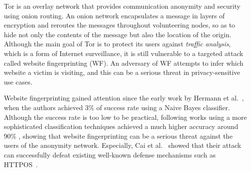 
\iffalse
Anonymizing networks are privacy technologies that provide a mancinism to anonymize internet communications so as to protect users from network eavesdroppers.
Although such systems are able to hide the communication (including both routing information and content), an attacker is still able to obtain different information by analyzing the network traffic.
Network analysis can provide very rich information about message length, timing, and frequency by which an attacker can easily identify the communicating parties, and therefore bypass an anonymizing system.
This problem is known as Website Fingerprinting (WF) attack, where an adversary attempts to recognize the encrypted traffic patterns of specific web pages without using any other information \cite{juarez14, murdoch2005low}.
\fi

Tor is an overlay network that provides communication anonymity and security using onion routing.
An onion network encapsulates a message in layers of encryption and reroutes the messages throughout volunteering nodes, so as to hide not only the contents of the message but also the location of the origin.
Although the main goal of Tor is to protect its users against {\it traffic analysis}, which is a form of Internet surveillance, it is still vulnerable to a targeted attack called website fingerprinting (WF).
An adversary of WF attempts to infer which website a victim is visiting, and this can be a serious threat in privacy-sensitive use cases.

Website fingerprinting gained attention since the early work by Hermann et al.~\cite{hermann}, when the authors achieved 3\% of success rate using a Naive Bayes classifier.
Although the success rate is too low to be practical, following works using a more sophisticated classification techniques achieved a much higher accuracy around 90\% \cite{panchenko11, wang2013improved, cai2012touching}, showing that website fingerprinting can be a serious threat against the users of the anonymity network.
Especially, Cai et al.~\cite{cai2012touching} showed that their attack can successfully defeat existing well-known defense mechanisms such as HTTPOS~\cite{luo2011}.

